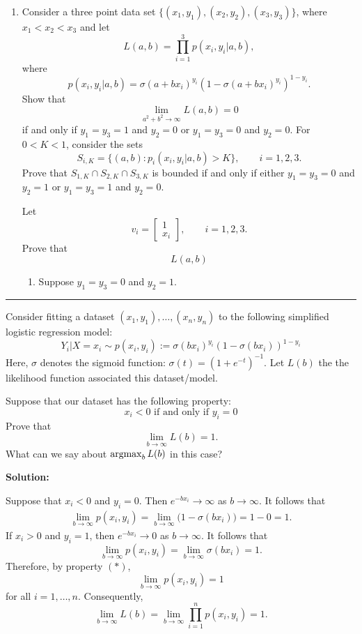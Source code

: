 \documentclass[12pt]{amsart}
\newcommand{\sol}{\bigskip\noindent\textbf{Solution: }}
\begin{document}
\begin{enumerate}
    \item Consider a three point data set $\{(x_1, y_1), (x_2, y_2), (x_3, y_3)\}$,
    where $x_1<x_2<x_3$ and let
    \[
        L(a,b)=\prod_{i=1}^3 p(x_i, y_i|a, b),
    \]
    where
    \[
        p(x_i, y_i|a, b) = \sigma(a + bx_i)^{y_i}(1 - \sigma(a + bx_i)^{y_i})^{1-y_i}.
    \]
    Show that
    \[
        \lim_{a^2+b^2\to\infty} L(a,b) = 0
    \]
    if and only if $y_1=y_3=1$ and $y_2=0$ or $y_1=y_3=0$ and $y_2=0$.
    For $0<K<1$, consider the sets
    \[
        S_{i,K} = \{(a, b) : p_i(x_i, y_i|a,b) > K\},\qquad i=1,2,3.
    \]
    Prove that $S_{1,K}\cap S_{2,K}\cap S_{3,K}$ is bounded if and only if
    either $y_1 = y_3 = 0$ and $y_2=1$ or $y_1=y_3=1$ and $y_2=0$.
    
    
    Let
    \[
        v_i = \begin{bmatrix}
            1\\x_i
        \end{bmatrix},\qquad i=1,2,3.
    \]
    Prove that
    \[
        L(a,b)
    \]
    \begin{enumerate}
    \item Suppose $y_1=y_3=0$ and $y_2=1$. 
    \end{enumerate}
    
\end{enumerate}

\bigskip
\hrule
\bigskip


Consider fitting a dataset $(x_1, y_1),\ldots,(x_n, y_n)$ to
the following simplified logistic regression model:
\[
    Y_i|X=x_i \sim p(x_i, y_i) := \sigma(bx_i)^{y_i}(1 - \sigma(bx_i))^{1-y_i}
\]
Here, $\sigma$ denotes the sigmoid function: $\sigma(t) = (1 + e^{-t})^{-1}$.
Let $L(b)$ the the likelihood function associated this dataset/model.

Suppose that our dataset has the following property:
\[
    \text{$x_i<0$ if and only if $y_i=0$}\tag{$*$}
\]
Prove that
\[
    \lim_{b\to\infty}L(b) = 1.
\]
What can we say about $\operatorname*{argmax}_b L(b)$ in this case?

\sol

Suppose that $x_i<0$ and $y_i=0$. Then $e^{-bx_i}\to \infty$ as $b\to\infty$. It follows that
\begin{align*}
    \lim_{b\to\infty}p(x_i, y_i) =  \lim_{b\to\infty} \big(1 - \sigma(bx_i)) = 1 - 0 = 1.
\end{align*}
If $x_i>0$ and $y_i=1$, then $e^{-bx_i}\to 0$ as $b\to\infty$. It follows that
\[
    \lim_{b\to\infty}p(x_i, y_i) =  \lim_{b\to\infty} \sigma(bx_i) = 1.
\]
Therefore, by property $(*)$,
\[
    \lim_{b\to\infty} p(x_i, y_i)=1
\]
for all $i=1,\ldots,n$. Consequently,
\[
    \lim_{b\to\infty} L(b) = \lim_{b\to\infty}\prod_{i=1}^n p(x_i, y_i) = 1.
\]
\end{document}
